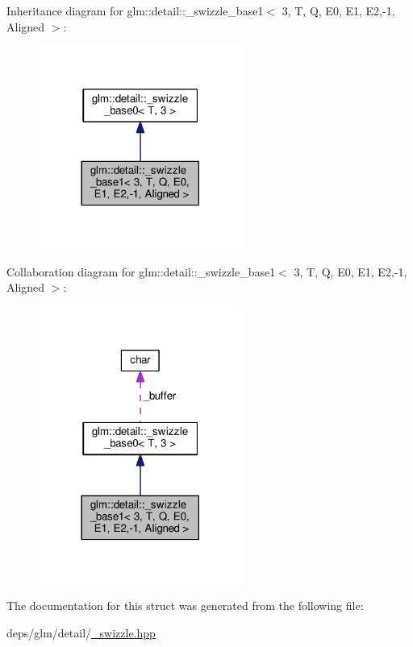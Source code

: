 Inheritance diagram for glm\+:\+:detail\+:\+:\+\_\+swizzle\+\_\+base1$<$ 3, T, Q, E0, E1, E2,-\/1, Aligned $>$\+:
\nopagebreak
\begin{figure}[H]
\begin{center}
\leavevmode
\includegraphics[width=189pt]{d5/dab/structglm_1_1detail_1_1__swizzle__base1_3_013_00_01T_00_01Q_00_01E0_00_01E1_00_01E2_00-1_00_01Aligned_01_4__inherit__graph}
\end{center}
\end{figure}


Collaboration diagram for glm\+:\+:detail\+:\+:\+\_\+swizzle\+\_\+base1$<$ 3, T, Q, E0, E1, E2,-\/1, Aligned $>$\+:
\nopagebreak
\begin{figure}[H]
\begin{center}
\leavevmode
\includegraphics[width=189pt]{d5/d14/structglm_1_1detail_1_1__swizzle__base1_3_013_00_01T_00_01Q_00_01E0_00_01E1_00_01E2_00-1_00_01Aligned_01_4__coll__graph}
\end{center}
\end{figure}


The documentation for this struct was generated from the following file\+:\begin{DoxyCompactItemize}
\item 
deps/glm/detail/\hyperlink{__swizzle_8hpp}{\+\_\+swizzle.\+hpp}\end{DoxyCompactItemize}
